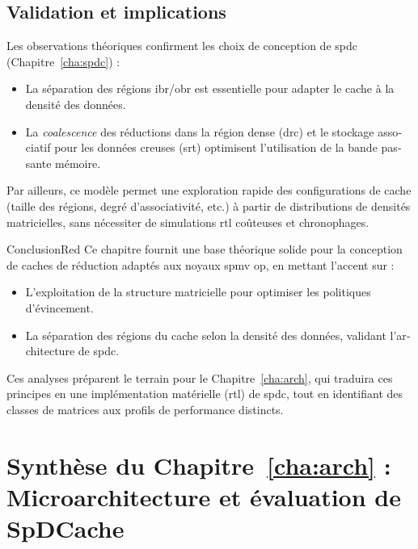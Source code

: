 \begin{otherlanguage}{french}
\subsection*{Validation et implications}

Les observations théoriques confirment les choix de conception de \acrlong{spdc} (Chapitre~\ref{cha:spdc}) :
\begin{itemize}
    \item La séparation des régions \acrshort{ibr}/\acrshort{obr} est essentielle pour adapter le cache à la densité des données.
    \item La \textit{coalescence} des réductions dans la région dense (\acrshort{drc}) et le stockage associatif pour les données creuses (\acrshort{srt}) optimisent l'utilisation de la bande passante mémoire.
\end{itemize}
Par ailleurs, ce modèle permet une exploration rapide des configurations de cache (taille des régions, degré d'associativité, etc.) à partir de distributions de densités matricielles, sans nécessiter de simulations \acrshort{rtl} coûteuses et chronophages.

\bigskip
\begin{highlight}{Conclusion}{Red}
    Ce chapitre fournit une base théorique solide pour la conception de caches de réduction adaptés aux noyaux \acrshort{spmv} \acrshort{op}, en mettant l'accent sur :
    \begin{itemize}
        \item L'exploitation de la structure matricielle pour optimiser les politiques d'évincement.
        \item La séparation des régions du cache selon la densité des données, validant l'architecture de \acrlong{spdc}.
    \end{itemize}
    Ces analyses préparent le terrain pour le Chapitre~\ref{cha:arch}, qui traduira ces principes en une implémentation matérielle (\acrshort{rtl}) de \acrlong{spdc}, tout en identifiant des classes de matrices aux profils de performance distincts.
\end{highlight}


\addtocounter{synthFCnt}{1}
\section{Synthèse du Chapitre~\ref{cha:arch} : Microarchitecture et évaluation de SpDCache}


\end{otherlanguage}
